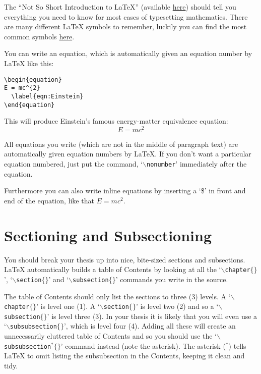 The ``Not So Short Introduction to \LaTeX{}'' (available \href{http://www.ctan.org/tex-archive/info/lshort/english/lshort.pdf}{here}) should tell you everything you need to know for most cases of typesetting mathematics. There are many different \LaTeX{} symbols to remember, luckily you can find the most common symbols \href{https://www.sharelatex.com/learn/List_of_Greek_letters_and_math_symbols}{here}.

You can write an equation, which is automatically given an equation number by \LaTeX{} like this:

\begin{verbatim}
\begin{equation}
E = mc^{2}
  \label{eqn:Einstein}
\end{equation}
\end{verbatim}

This will produce Einstein's famous energy-matter equivalence equation:
\begin{equation}
E = mc^{2}
\label{eqn:Einstein}
\end{equation}

All equations you write (which are not in the middle of paragraph text) are automatically given equation numbers by \LaTeX{}. If you don't want a particular equation numbered, just put the command, `$\backslash$\texttt{nonumber}' immediately after the equation.

Furthermore you can also write inline equations by inserting a `\$' in front and end of the equation, like that $E=mc^2$.


\section{Sectioning and Subsectioning}

You should break your thesis up into nice, bite-sized sections and subsections. \LaTeX{} automatically builds a table of Contents by looking at all the `$\backslash$\texttt{chapter}$\{\}$', `$\backslash$\texttt{section}$\{\}$' and `$\backslash$\texttt{subsection}$\{\}$' commands you write in the source.

The table of Contents should only list the sections to three (3) levels. A `$\backslash$\texttt{chapter}$\{\}$' is level one (1). A `$\backslash$\texttt{section}$\{\}$' is level two (2) and so a `$\backslash$\texttt{subsection}$\{\}$' is level three (3). In your thesis it is likely that you will even use a `$\backslash$\texttt{subsubsection}$\{\}$', which is level four (4). Adding all these will create an unnecessarily cluttered table of Contents and so you should use the `$\backslash$\texttt{subsubsection$^{*}\{\}$}' command instead (note the asterisk). The asterisk ($^{*}$) tells \LaTeX{} to omit listing the subsubsection in the Contents, keeping it clean and tidy.

